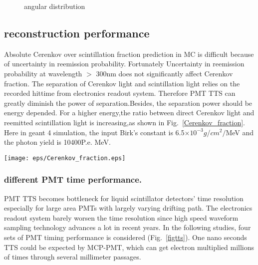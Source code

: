 \documentclass[a4paper,10pt]{cpc-hepnp}
\begin{document}
\begin{figure*}[htbp]
\centering
{}
\label{fig_subfig}
\caption{angular distribution}
\end{figure*}




\subsection{reconstruction performance}
Absolute Cerenkov over scintillation fraction prediction in MC is difficult because of uncertainty in reemission probability.
Fortunately Uncertainty  in  reemission  probability  at  wavelength $>$ 300nm does not significantly affect Cerenkov fraction\cite{DocDB9847}.
The separation of Cerenkov light and scintillation light relies on the recorded hittime from electronics readout system.
Therefore PMT TTS can greatly diminish the power of separation.Besides, the separation power should be energy depended.
For a higher energy,the ratio between direct Cerenkov light and reemitted scintillation light is increasing,as shown in Fig.~\ref{Cerenkov_fraction}.
Here in geant 4 simulation, the input Birk's constant is 6.5$\times10^{-3}g$/$cm^{2}$$/$MeV and the photon yield
is 10400P.e. \/MeV.
\begin{center}
\texttt{[image: eps/Cerenkov\_fraction.eps]}
\end{center}
\subsubsection{different PMT time performance.}
PMT TTS becomes bottleneck for liquid scintillator detectors' time resolution especially for large area
PMTs with largely varying drifting path. The electronics readout system barely worsen the time resolution
since high speed waveform sampling technology advances a lot in recent years. In the following studies, four sets of
PMT timing performance is considered  (Fig.~\ref{figtts}). One nano seconds TTS could be expected by MCP-PMT,
which can get electron multiplied
millions of times through several millimeter passages.
\end{document}
